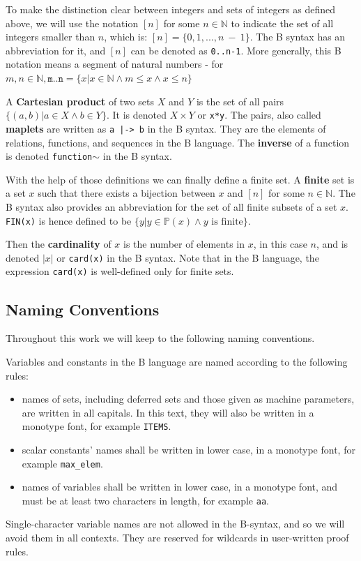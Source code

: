 \documentclass[12pt,journal,duplex]{IEEEtran}
\begin{document}
	To make the distinction clear between integers and sets of integers as defined above, we will use the notation $[n]$ for some $n \in \mathbb{N}$ to indicate the set of all integers smaller than $n$, which is: $[n] = \{0,1, ...,n~-~1\}$. The B syntax has an abbreviation for it, and $[n]$ can be denoted as \texttt{0..n-1}. More generally, this B notation means a segment of natural numbers - for $m, n \in \mathbb{N}, \texttt{m..n} = \{x | x \in \mathbb{N} \wedge m \leq x \wedge x \leq n\}$

	A \textbf{Cartesian product} of two sets $X$ and $Y$ is the set of all pairs $\{(a,b) | a \in X \wedge b \in Y  \}$. It is denoted $X \times Y$ or \texttt{x*y}. The pairs, also called \textbf{maplets} are written as \texttt{a~|->~b} in the B syntax. They are the elements of relations, functions, and sequences in the B language. The \textbf{inverse} of a function is denoted \texttt{function}$\sim$ in the B syntax.

	With the help of those definitions we can finally define a finite set. A \textbf{finite} set is a set $x$ such that there exists a bijection between $x$ and $[n]$ for some $n \in \mathbb{N}$.  The B syntax also provides an abbreviation for the set of all finite subsets of a set $x$. \texttt{FIN(x)} is hence defined to be $\{y| y \in \mathbb{P}(x) \wedge y \text{ is finite} \}$.

	Then the \textbf{cardinality} of $x$ is the number of elements in $x$, in this case $n$, and is denoted $|x|$ or \texttt{card(x)} in the B syntax. Note that in the B language, the expression \texttt{card(x)} is well-defined only for finite sets.

	\subsection{Naming Conventions}
	Throughout this work we will keep to the following naming conventions.

	Variables and constants in the B language are named according to the following rules:
	\begin{itemize}
		\item names of sets, including deferred sets and those given as machine parameters, are written in all capitals. In this text, they will also be written in a monotype font, for example \texttt{ITEMS}.
		\item scalar constants' names shall be written in lower case, in a monotype font, for example \texttt{max\_elem}.
		\item names of variables shall be written in lower case, in a monotype font, and must be at least two characters in length, for example \texttt{aa}.
	\end{itemize}
	Single-character variable names are not allowed in the B-syntax, and so we will avoid them in all contexts. They are reserved for wildcards in user-written proof rules.
\end{document}
